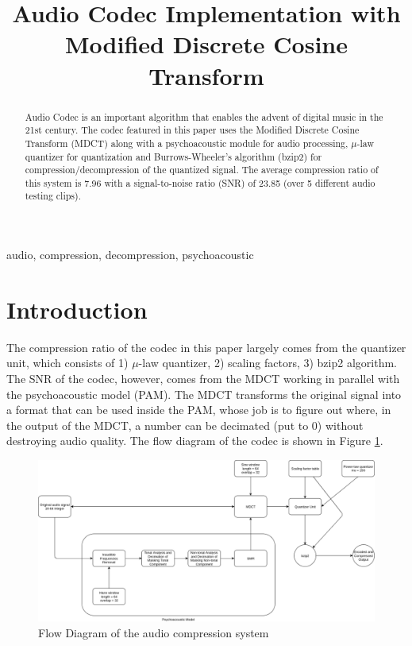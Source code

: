 \documentclass[conference]{IEEEtran}
\begin{document}
	
	\title{Audio Codec Implementation with Modified Discrete Cosine Transform
	}
	
	\author{
	}
	
	\maketitle
	
	\begin{abstract}
		Audio Codec is an important algorithm that enables the advent of digital music in the 21st century. The codec featured in this paper uses the Modified Discrete Cosine Transform (MDCT) along with a psychoacoustic module for audio processing, $\mu$-law quantizer for quantization and Burrows-Wheeler's algorithm (bzip2) for compression/decompression of the quantized signal. The average compression ratio of this system is 7.96 with a signal-to-noise ratio (SNR) of 23.85 (over 5 different audio testing clips).
	\end{abstract}
	
	\begin{IEEEkeywords}
		audio, compression, decompression, psychoacoustic
	\end{IEEEkeywords}
	
	\section{Introduction}
	The compression ratio of the codec in this paper largely comes from the quantizer unit, which consists of 1) $\mu$-law quantizer, 2) scaling factors, 3) bzip2 algorithm. The SNR of the codec, however, comes from the MDCT working in parallel with the psychoacoustic model (PAM). The MDCT transforms the original signal into a format that can be used inside the PAM, whose job is to figure out where, in the output of the MDCT, a number can be decimated (put to 0) without destroying audio quality. The flow diagram of the codec is shown in Figure \ref{fig1}.
	
	
	\begin{figure}
		\centering
		\includegraphics[width=1\linewidth]{flow_diagram_codec}
		\caption{Flow Diagram of the audio compression system}
		\label{fig1}
	\end{figure}
	
\end{document}
